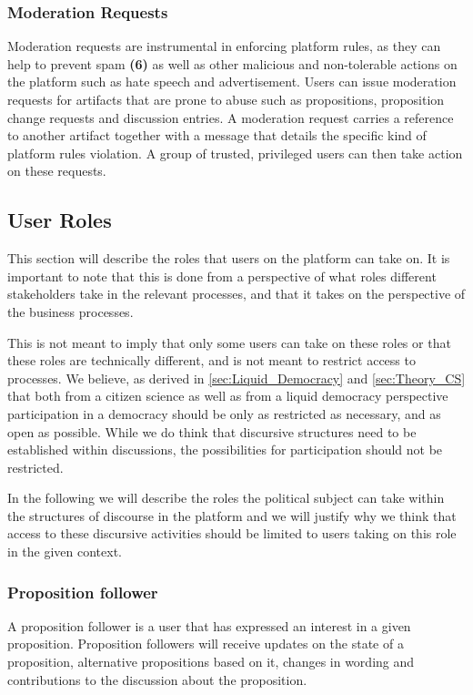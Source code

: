 \subsubsection{Moderation Requests}
\label{ssec:Moderation_Requests}
Moderation requests are instrumental in enforcing platform rules, as they can help to prevent spam \textbf{(6)} as well as other malicious and non-tolerable actions on the platform such as hate speech and advertisement.
Users can issue moderation requests for artifacts that are prone to abuse such as propositions, proposition change requests and discussion entries.
A moderation request carries a reference to another artifact together with a message that details the specific kind of platform rules violation.
A group of trusted, privileged users can then take action on these requests.

\subsection{User Roles}
\label{sec:UserRoles}
This section will describe the roles that users on the platform can take on.
It is important to note that this is done from a perspective of what roles different stakeholders take in the relevant processes, and that it takes on the perspective of the business processes.

This is not meant to imply that only some users can take on these roles or that these roles are technically different, and is not meant to restrict access to processes.
We believe, as derived in \ref{sec:Liquid_Democracy} and \ref{sec:Theory_CS} that both from a citizen science as well as from a liquid democracy perspective participation in a democracy should be only as restricted as necessary, and as open as possible.
While we do think that discursive structures need to be established within discussions, the possibilities for participation should not be restricted.

In the following we will describe the roles the political subject can take within the structures of discourse in the platform and we will justify why we think that access to these discursive activities should be limited to users taking on this role in the given context.

\subsubsection{Proposition follower}
A proposition follower is a user that has expressed an interest in a given proposition. Proposition followers will receive updates on the state of a proposition, alternative propositions based on it, changes in wording and contributions to the discussion about the proposition.

